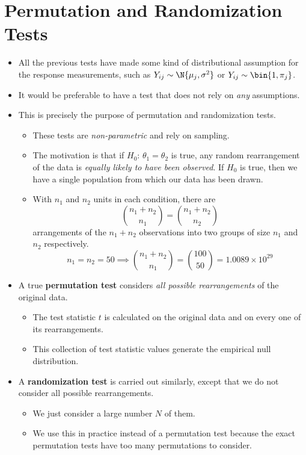 \section{Permutation and Randomization Tests}
\begin{itemize}
      \item All the previous tests have made some kind of distributional assumption
            for the response measurements, such as $ Y_{ij} \sim \N{\mu_j,\sigma^2} $ or
            $ Y_{ij}\sim \bin{1,\pi_j} $.
      \item It would be preferable to have a test that does not rely on \emph{any}
            assumptions.
      \item This is precisely the purpose of permutation and randomization tests.
            \begin{itemize}
                  \item These tests are \emph{non-parametric} and rely on sampling.
                  \item The motivation is that if $ H_0 $: $ \theta_1=\theta_2 $
                        is true, any random rearrangement of the data is \emph{equally likely
                              to have been observed}. If $ H_0 $ is true, then we have a single population
                        from which our data has been drawn.
                  \item With $ n_1 $ and $ n_2 $ units in each condition, there are
                        \[ \binom{n_1+n_2}{n_1}=\binom{n_1+n_2}{n_2} \]
                        arrangements of the $ n_1+n_2 $ observations into two groups of size $ n_1 $
                        and $ n_2 $ respectively.
                        \[ n_1=n_2=50\implies\binom{n_1+n_2}{n_1}=\binom{100}{50}=1.0089\times 10^{29} \]
            \end{itemize}
      \item A true \textbf{permutation test} considers \emph{all possible rearrangements}
            of the original data.
            \begin{itemize}
                  \item The test statistic $ t $ is calculated on the original data and on every one of
                        its rearrangements.
                  \item This collection of test statistic values generate the empirical null distribution.
            \end{itemize}
      \item A \textbf{randomization test} is carried out similarly, except that we do not
            consider all possible rearrangements.
            \begin{itemize}
                  \item We just consider a large number $ N $ of them.
                  \item We use this in practice instead of a permutation test because
                        the exact permutation tests have too many permutations to consider.
            \end{itemize}
\end{itemize}
